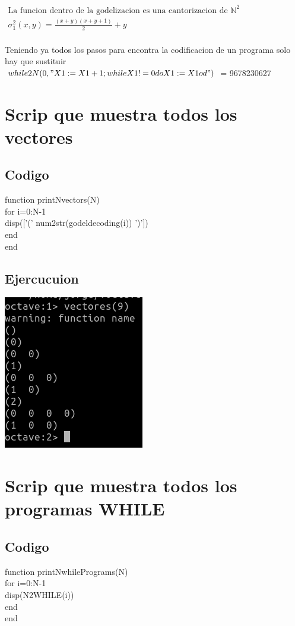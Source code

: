 \documentclass[a4paper]{article}
\theoremstyle{definition}
\begin{document}
\begin{center}
$\begin{aligned}
\text{La funcion dentro de la godelizacion es una cantorizacion de } \mathbb{N}^2\\
\sigma^2_1(x,y) = \frac{(x+y)(x+y+1)}{2}+y\\
\end{aligned}$
\end{center} 
Teniendo ya todos los pasos para encontra la codificacion de un programa solo hay que sustituir\\ 
$while2N(0,"X1:=X1+1;while X1!=0 do X1:=X1 od") $ = 9678230627


\section{Scrip que muestra todos los vectores}
\subsection{Codigo}
function printNvectors(N)\\
for i=0:N-1\\
disp([’(’ num2str(godeldecoding(i)) ’)’])\\
end\\
end\\
\subsection{Ejercucuion}
\includegraphics{Nvectores}

\section{Scrip que muestra todos los programas WHILE}
\subsection{Codigo}
function printNwhilePrograms(N)\\
for i=0:N-1\\
disp(N2WHILE(i))\\
end\\
end\\
\end{document}
